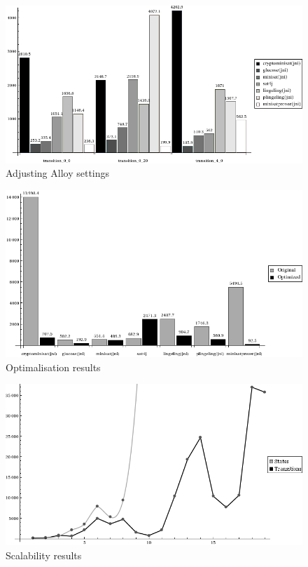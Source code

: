 \begin{figure}[htp]
\centering
\includegraphics[scale=0.5]{figures/measurements_alloy_settings}
\caption{Adjusting Alloy settings}
\label{fig:measurements_alloy_settings}
\end{figure}

\begin{figure}[htp]
\centering
\includegraphics[scale=0.5]{figures/measurements_optimalizations}
\caption{Optimalisation results}
\label{fig:measurements_optimalizations}
\end{figure}

\begin{figure}[htp]
\centering
\includegraphics[scale=0.5]{figures/measurements_scalability}
\caption{Scalability results}
\label{fig:measurements_scalability}
\end{figure}

